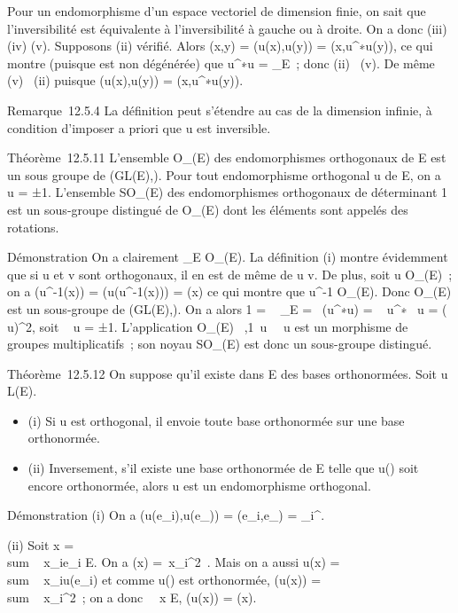 \documentclass[]{article}
\begin{document}
Pour un endomorphisme d'un espace vectoriel de dimension finie, on sait
que l'inversibilité est équivalente à l'inversibilité à gauche ou à
droite. On a donc (iii) \Leftrightarrow (iv)
\Leftrightarrow (v). Supposons (ii) vérifié. Alors \phi(x,y) =
\phi(u(x),u(y)) = \phi(x,u^∗\cdot u(y)), ce qui montre (puisque \phi est
non dégénérée) que u^∗\cdot u =
\mathrmId\_E~; donc (ii) \rigtharrow~(v). De même (v)
\rigtharrow~(ii) puisque \phi(u(x),u(y)) = \phi(x,u^∗\cdot u(y)).

Remarque~12.5.4 La définition peut s'étendre au cas de la dimension
infinie, à condition d'imposer a priori que u est inversible.

Théorème~12.5.11 L'ensemble O\_\Phi(E) des endomorphismes
orthogonaux de E est un sous groupe de (GL(E),\cdot). Pour tout
endomorphisme orthogonal u de E, on a
~ u = ±1.
L'ensemble SO\_\Phi(E) des endomorphismes orthogonaux de
déterminant 1 est un sous-groupe distingué de O\_\Phi(E) dont les
éléments sont appelés des rotations.

Démonstration On a clairement \mathrmId\_E \in
O\_\Phi(E). La définition (i) montre évidemment que si u et v sont
orthogonaux, il en est de même de u \cdot v. De plus, soit u \in
O\_\Phi(E)~; on a \Phi(u^-1(x)) = \Phi(u(u^-1(x)))
= \Phi(x) ce qui montre que u^-1 \in O\_\Phi(E). Donc
O\_\Phi(E) est un sous-groupe de (GL(E),\cdot). On a alors 1
= ~
\mathrmId\_E =\
 (u^∗\cdot u)
= ~
u^∗~ u
= (~
u)^2, soit
\mathrm{det}~ u = ±1.
L'application O\_\Phi(E) \rightarrow~,1\,
u\mapsto~~
u est un morphisme de groupes multiplicatifs~; son noyau
SO\_\Phi(E) est donc un sous-groupe distingué.

Théorème~12.5.12 On suppose qu'il existe dans E des bases orthonormées.
Soit u \in L(E).

\begin{itemize}
\itemsep1pt\parskip0pt
\item
  (i) Si u est orthogonal, il envoie toute base orthonormée sur une base
  orthonormée.
\item
  (ii) Inversement, s'il existe une base orthonormée  de E telle que
  u(\mathcal{E}) soit encore orthonormée, alors u est un endomorphisme orthogonal.
\end{itemize}

Démonstration (i) On a \phi(u(e\_i),u(e\_\jmath)) =
\phi(e\_i,e\_\jmath) = \delta\_i^\jmath.

(ii) Soit x = \\sum ~
x\_ie\_i \in E. On a \Phi(x) =\
\sum  x\_i^2~. Mais on a aussi
u(x) = \\sum ~
x\_iu(e\_i) et comme u() est orthonormée, \Phi(u(x))
= \\sum ~
x\_i^2~; on a donc \forall~~x \in E,
\Phi(u(x)) = \Phi(x).
\end{document}
